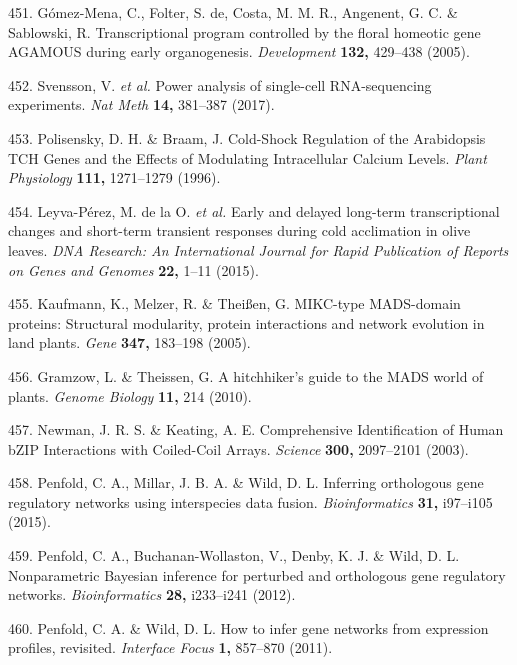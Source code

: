 \documentclass[12pt,]{book}
\begin{document}
\hypertarget{ref-gomez_mena_transcriptional_2005}{}
451. Gómez-Mena, C., Folter, S. de, Costa, M. M. R., Angenent, G. C. \&
Sablowski, R. Transcriptional program controlled by the floral homeotic
gene AGAMOUS during early organogenesis. \emph{Development}
\textbf{132,} 429--438 (2005).

\hypertarget{ref-svensson_power_2017}{}
452. Svensson, V. \emph{et al.} Power analysis of single-cell
RNA-sequencing experiments. \emph{Nat Meth} \textbf{14,} 381--387
(2017).

\hypertarget{ref-polisensky_cold_shock_1996}{}
453. Polisensky, D. H. \& Braam, J. Cold-Shock Regulation of the
Arabidopsis TCH Genes and the Effects of Modulating Intracellular
Calcium Levels. \emph{Plant Physiology} \textbf{111,} 1271--1279 (1996).

\hypertarget{ref-leyva_perez_early_2015}{}
454. Leyva-Pérez, M. de la O. \emph{et al.} Early and delayed long-term
transcriptional changes and short-term transient responses during cold
acclimation in olive leaves. \emph{DNA Research: An International
Journal for Rapid Publication of Reports on Genes and Genomes}
\textbf{22,} 1--11 (2015).

\hypertarget{ref-kaufmann_mikc_type_2005}{}
455. Kaufmann, K., Melzer, R. \& Theißen, G. MIKC-type MADS-domain
proteins: Structural modularity, protein interactions and network
evolution in land plants. \emph{Gene} \textbf{347,} 183--198 (2005).

\hypertarget{ref-gramzow_hitchhikers_2010}{}
456. Gramzow, L. \& Theissen, G. A hitchhiker's guide to the MADS world
of plants. \emph{Genome Biology} \textbf{11,} 214 (2010).

\hypertarget{ref-newman_comprehensive_2003}{}
457. Newman, J. R. S. \& Keating, A. E. Comprehensive Identification of
Human bZIP Interactions with Coiled-Coil Arrays. \emph{Science}
\textbf{300,} 2097--2101 (2003).

\hypertarget{ref-penfold_inferring_2015}{}
458. Penfold, C. A., Millar, J. B. A. \& Wild, D. L. Inferring
orthologous gene regulatory networks using interspecies data fusion.
\emph{Bioinformatics} \textbf{31,} i97--i105 (2015).

\hypertarget{ref-penfold_nonparametric_2012}{}
459. Penfold, C. A., Buchanan-Wollaston, V., Denby, K. J. \& Wild, D. L.
Nonparametric Bayesian inference for perturbed and orthologous gene
regulatory networks. \emph{Bioinformatics} \textbf{28,} i233--i241
(2012).

\hypertarget{ref-penfold_how_2011}{}
460. Penfold, C. A. \& Wild, D. L. How to infer gene networks from
expression profiles, revisited. \emph{Interface Focus} \textbf{1,}
857--870 (2011).
\end{document}

